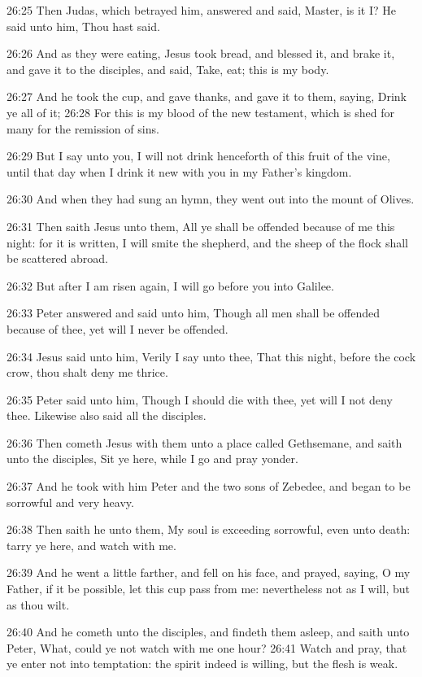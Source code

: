 26:25 Then Judas, which betrayed him, answered and said, Master, is it
I?  He said unto him, Thou hast said.

26:26 And as they were eating, Jesus took bread, and blessed it, and
brake it, and gave it to the disciples, and said, Take, eat; this is
my body.

26:27 And he took the cup, and gave thanks, and gave it to them,
saying, Drink ye all of it; 26:28 For this is my blood of the new
testament, which is shed for many for the remission of sins.

26:29 But I say unto you, I will not drink henceforth of this fruit of
the vine, until that day when I drink it new with you in my Father's
kingdom.

26:30 And when they had sung an hymn, they went out into the mount of
Olives.

26:31 Then saith Jesus unto them, All ye shall be offended because of
me this night: for it is written, I will smite the shepherd, and the
sheep of the flock shall be scattered abroad.

26:32 But after I am risen again, I will go before you into Galilee.

26:33 Peter answered and said unto him, Though all men shall be
offended because of thee, yet will I never be offended.

26:34 Jesus said unto him, Verily I say unto thee, That this night,
before the cock crow, thou shalt deny me thrice.

26:35 Peter said unto him, Though I should die with thee, yet will I
not deny thee. Likewise also said all the disciples.

26:36 Then cometh Jesus with them unto a place called Gethsemane, and
saith unto the disciples, Sit ye here, while I go and pray yonder.

26:37 And he took with him Peter and the two sons of Zebedee, and
began to be sorrowful and very heavy.

26:38 Then saith he unto them, My soul is exceeding sorrowful, even
unto death: tarry ye here, and watch with me.

26:39 And he went a little farther, and fell on his face, and prayed,
saying, O my Father, if it be possible, let this cup pass from me:
nevertheless not as I will, but as thou wilt.

26:40 And he cometh unto the disciples, and findeth them asleep, and
saith unto Peter, What, could ye not watch with me one hour?  26:41
Watch and pray, that ye enter not into temptation: the spirit indeed
is willing, but the flesh is weak.


